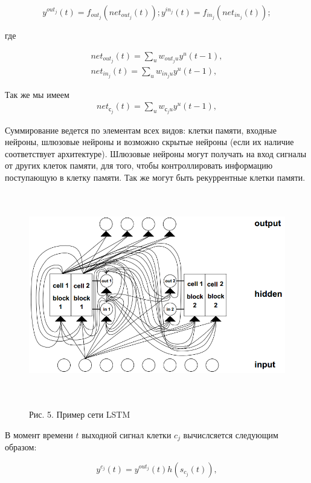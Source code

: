 \documentclass[14pt]{article}
\begin{document}
\begin{equation}
y^{out_j}(t) = f_{out_j}(net_{out_j}(t)); y^{in_j}(t) = f_{in_j}(net_{in_j}(t));
\end{equation}

где

\begin{eqnarray}
net_{out_j}(t) = \sum\limits_uw_{out_ju}y^u(t - 1),\nonumber\\
net_{in_j}(t) = \sum\limits_uw_{in_ju}y^u(t - 1),\nonumber
\end{eqnarray}


Так же мы имеем
\begin{eqnarray}
net_{с_j}(t) = \sum\limits_uw_{с_ju}y^u(t - 1),\nonumber
\end{eqnarray}

Суммирование ведется по элементам всех видов: клетки памяти, входные нейроны, шлюзовые нейроны и возможно скрытые нейроны (если их наличие соответствует архитектуре).  Шлюзовые нейроны могут получать на вход сигналы от других клеток памяти, для того, чтобы контроллировать информацию поступающую в клетку памяти. Так же могут быть рекуррентные клетки памяти.

\begin{figure}[!h]
    \centering
        \includegraphics[height=9cm]{Fig5.png}
    \parbox[t][1.2cm][c]{16cm}{
        \centering
        Рис. 5. Пример сети LSTM
    }
\end{figure}


В момент времени $t$ выходной сигнал клетки $c_j$ вычислсяется следующим образом:

\begin{equation}
y^{c_j}(t) = y^{out_j}(t)h(s_{c_j}(t)),\nonumber
\end{equation}
\end{document}
